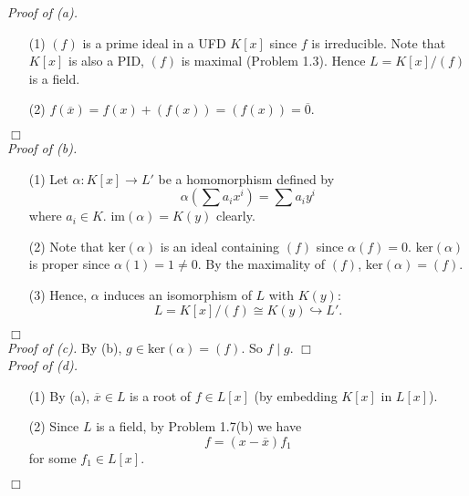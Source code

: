 \documentclass{article}
\begin{document}
\emph{Proof of (a).}
\begin{enumerate}
\item[(1)]
  $(f)$ is a prime ideal in a UFD $K[x]$ since $f$ is irreducible.
  Note that $K[x]$ is also a PID, $(f)$ is maximal (Problem 1.3).
  Hence $L = K[x]/(f)$ is a field.

\item[(2)]
  $f(\overline{x}) = f(x) + (f(x)) = (f(x)) = \overline{0}$.
\end{enumerate}
$\Box$ \\



\emph{Proof of (b).}
\begin{enumerate}
\item[(1)]
  Let $\alpha: K[x] \to L'$ be a homomorphism
  defined by
  \[
    \alpha\left(\sum a_i x^i\right) = \sum a_i y^i
  \]
  where $a_i \in K$.
  $\mathrm{im}(\alpha) = K(y)$ clearly.

\item[(2)]
  Note that $\mathrm{ker}(\alpha)$ is an ideal containing $(f)$ since $\alpha(f) = 0$.
  $\mathrm{ker}(\alpha)$ is proper since $\alpha(1) = 1 \neq 0$.
  By the maximality of $(f)$, $\mathrm{ker}(\alpha) = (f)$.

\item[(3)]
  Hence, $\alpha$ induces an isomorphism of $L$ with $K(y)$:
  \[
    L = K[x]/(f) \cong K(y) \hookrightarrow L'.
  \]
\end{enumerate}
$\Box$ \\



\emph{Proof of (c).}
By (b), $g \in \mathrm{ker}(\alpha) = (f)$. So $f \mid g$.
$\Box$ \\



\emph{Proof of (d).}
\begin{enumerate}
\item[(1)]
  By (a), $\overline{x} \in L$ is a root of $f \in L[x]$ (by embedding $K[x]$ in $L[x]$).

\item[(2)]
  Since $L$ is a field, by Problem 1.7(b)
  we have
  \[
    f = (x - \overline{x})f_1
  \]
  for some $f_1 \in L[x]$.
\end{enumerate}
$\Box$ \\\\



\end{document}
